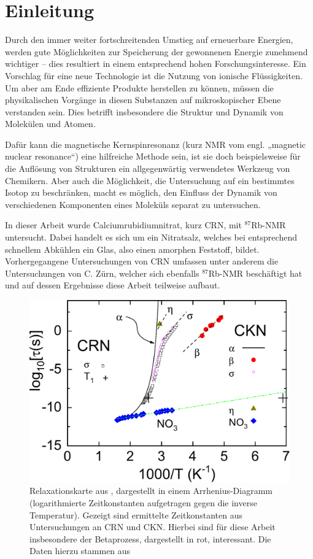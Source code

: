 \chapter{Einleitung}


Durch den immer weiter fortschreitenden Umstieg auf erneuerbare Energien, werden gute Möglichkeiten zur Speicherung der gewonnenen Energie zunehmend wichtiger -- dies resultiert in einem entsprechend hohen Forschungsinteresse. Ein Vorschlag für eine neue Technologie ist die Nutzung von ionische Flüssigkeiten. Um aber am Ende effiziente Produkte herstellen zu können, müssen die physikalischen Vorgänge in diesen Substanzen auf mikroskopischer Ebene verstanden sein. Dies betrifft insbesondere die Struktur und Dynamik von Molekülen und Atomen. 

Dafür kann die magnetische Kernspinresonanz (kurz NMR vom engl. „magnetic nuclear resonance“) eine hilfreiche Methode sein, ist sie doch beispielsweise für die Auflösung von Strukturen ein allgegenwärtig verwendetes Werkzeug von Chemikern. Aber auch die Möglichkeit, die Untersuchung auf ein bestimmtes Isotop zu beschränken, macht es möglich, den Einfluss der Dynamik von verschiedenen Komponenten eines Moleküls separat zu untersuchen.

In dieser Arbeit wurde Calciumrubidiumnitrat, kurz CRN, mit $^\text{87}$Rb-NMR untersucht. Dabei handelt es sich um ein Nitratsalz, welches bei entsprechend schnellem Abkühlen ein Glas, also einen amorphen Feststoff, bildet. Vorhergegangene Untersuchungen von CRN umfassen unter anderem die Untersuchungen von C. Zürn, welcher sich ebenfalls $^\text{87}$Rb-NMR beschäftigt hat \cite{zuern_paper} und auf dessen Ergebnisse diese Arbeit teilweise aufbaut.
\begin{figure}
	\begin{center}
		\includegraphics[width=.7\textwidth]{graphics/zuern/Plot1_b.pdf}
	\end{center}
	\caption{Relaxationskarte aus \cite{zuern_paper}, dargestellt in einem Arrhenius-Diagramm (logarithmierte Zeitkonstanten aufgetragen gegen die inverse Temperatur). Gezeigt sind ermittelte Zeitkonstanten aus Untersuchungen an CRN und CKN. Hierbei sind für diese Arbeit insbesondere der Betaprozess, dargestellt in rot, interessant. Die Daten hierzu stammen aus \cite{}} \label{fig:einl:zuernpaper}
\end{figure}

